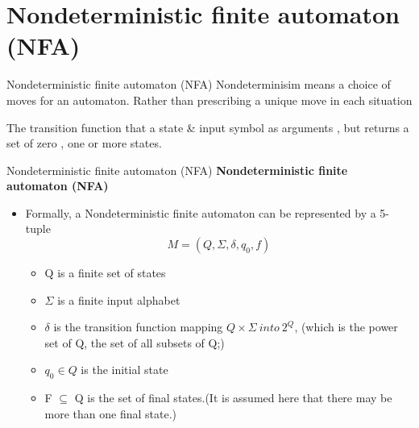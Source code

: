 \documentclass{beamer}
\begin{document}
\section{Nondeterministic finite automaton (NFA)}
\begin{frame}{Nondeterministic finite automaton (NFA)}
	Nondeterminisim means a choice of moves for an automaton. Rather than prescribing a unique move in each situation
	\par The transition function that a state \& input symbol as arguments , but returns a set of zero , one or more states.\\
	
\end{frame}
\begin{frame}{Nondeterministic finite automaton (NFA)}
	\textbf{Nondeterministic finite automaton (NFA)}
	\begin{itemize}
		\item Formally, a Nondeterministic finite automaton can be represented by a 5-tuple $$M=(Q,\Sigma,\delta,q_0,f)$$
		\begin{itemize}
			\item Q is a finite set of states
			\item $\Sigma$ is a finite input alphabet
			\item $\delta$ is the transition function mapping $ Q \times \Sigma\  into\  2^Q$, (which is the 
			power set of Q, the set of all subsets of Q;)
			\item $q_0 \in Q$ is the initial state
			\item F $\subseteq$ Q is the set of final states.(It is assumed here that there may be
			more than one final state.)
		\end{itemize}
	\end{itemize}
\end{frame}
\end{document}
